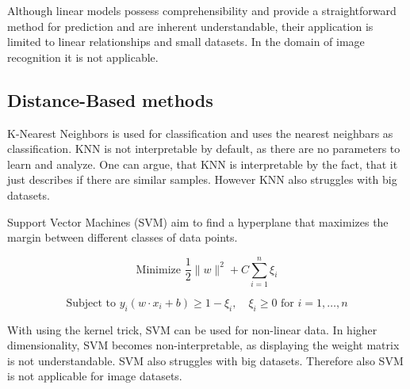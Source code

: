 %
%
%
%

Although linear models possess comprehensibility and provide a straightforward method for prediction and are inherent understandable, their application is limited to linear relationships and small datasets. In the domain of image recognition it is not applicable.

\subsection{Distance-Based methods}
K-Nearest Neighbors is used for classification and uses the nearest neighbars as classification. KNN is not interpretable by default, as there are no parameters to learn and analyze. One can argue, that KNN is interpretable by the fact, that it just describes if there are similar samples. However KNN also struggles with big datasets.

Support Vector Machines (SVM) aim to find a hyperplane that maximizes the margin between different classes of data points.

$$\text{Minimize } \frac{1}{2} \|w\|^2 + C \sum_{i=1}^{n} \xi_i$$

$$\text{Subject to } y_i (w \cdot x_i + b) \geq 1 - \xi_i, \quad \xi_i \geq 0 \text{ for } i = 1, \ldots, n$$

With using the kernel trick, SVM can be used for non-linear data. In higher dimensionality, SVM becomes non-interpretable, as displaying the weight matrix is not understandable. SVM also struggles with big datasets. Therefore also SVM is not applicable for image datasets.


